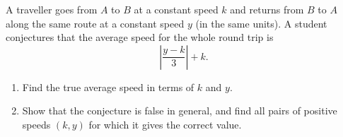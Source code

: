 A traveller goes from $A$ to $B$ at a constant speed $k$ and returns from $B$ to $A$ along the same route at a constant speed $y$ (in the same units). A student conjectures that the average speed for the whole round trip is
\[\left|\dfrac{y-k}{3}\right|+k.\]
\begin{enumerate}
\item[(a)] Find the true average speed in terms of $k$ and $y$.
\item[(b)] Show that the conjecture is false in general, and find all pairs of positive speeds $(k,y)$ for which it gives the correct value.
\end{enumerate}
